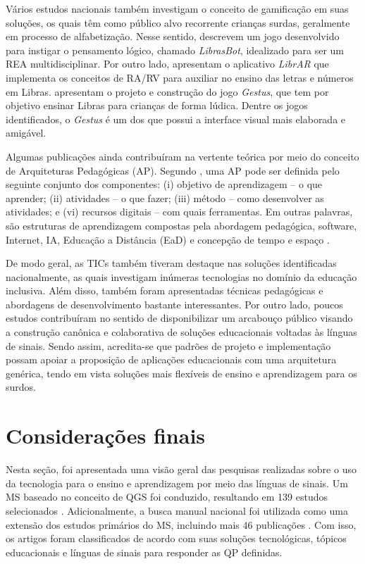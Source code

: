 Vários estudos nacionais também investigam o conceito de gamificação em suas soluções, os quais têm como público alvo recorrente crianças surdas, geralmente em processo de alfabetização. Nesse sentido, \cite{BRA23} descrevem um jogo desenvolvido para instigar o pensamento lógico, chamado \textit{LibrasBot}, idealizado para ser um REA multidisciplinar. Por outro lado,  apresentam o aplicativo \textit{LibrAR} que implementa os conceitos de RA/RV para auxiliar no ensino das letras e números em Libras.  apresentam o projeto e construção do jogo \textit{Gestus}, que tem por objetivo ensinar Libras para crianças de forma lúdica. Dentre os jogos identificados, o \textit{Gestus} é um dos que possui a interface visual mais elaborada e amigável.

Algumas publicações ainda contribuíram na vertente teórica por meio do conceito de Arquiteturas Pedagógicas (AP). Segundo , uma AP pode ser definida pelo seguinte conjunto dos componentes: (i) objetivo de aprendizagem -- o que aprender; (ii) atividades -- o que fazer; (iii) método -- como desenvolver as atividades; e (vi) recursos digitais -- com quais ferramentas. Em outras palavras, são estruturas de aprendizagem compostas pela abordagem pedagógica, software, Internet, IA, Educação a Distância (EaD) e concepção de tempo e espaço \cite{BRA27}.

De modo geral, as TICs também tiveram destaque nas soluções identificadas nacionalmente, as quais investigam inúmeras tecnologias no domínio da educação inclusiva. Além disso, também foram apresentadas técnicas pedagógicas e abordagens de desenvolvimento bastante interessantes. Por outro lado, poucos estudos contribuíram no sentido de disponibilizar um arcabouço público visando a construção canônica e colaborativa de soluções educacionais voltadas às línguas de sinais. Sendo assim, acredita-se que padrões de projeto e implementação possam apoiar a proposição de aplicações educacionais com uma arquitetura genérica, tendo em vista soluções mais flexíveis de ensino e aprendizagem para os surdos.


\section{Considerações finais}
\label{ms:fim}

Nesta seção, foi apresentada uma visão geral das pesquisas realizadas sobre o uso da tecnologia para o ensino e aprendizagem por meio das línguas de sinais. Um MS baseado no conceito de QGS foi conduzido, resultando em 139 estudos selecionados \cite{FalvoJr2020_FIE}. Adicionalmente, a busca manual nacional foi utilizada como uma extensão dos estudos primários do MS, incluindo mais 46 publicações \cite{FalvoJr2020_SBIE}. Com isso, os artigos foram classificados de acordo com suas soluções tecnológicas, tópicos educacionais e línguas de sinais para responder as QP definidas. 

